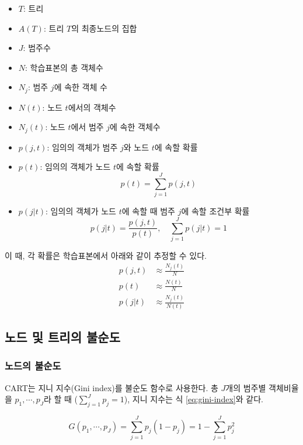 \documentclass[
]{book}
\providecommand{\tightlist}{%
  \setlength{\itemsep}{0pt}\setlength{\parskip}{0pt}}
\begin{document}
\begin{itemize}
\tightlist
\item
  \(T\): 트리
\item
  \(A(T)\): 트리 \(T\)의 최종노드의 집합
\item
  \(J\): 범주수
\item
  \(N\): 학습표본의 총 객체수
\item
  \(N_j\): 범주 \(j\)에 속한 객체 수
\item
  \(N(t)\): 노드 \(t\)에서의 객체수
\item
  \(N_j(t)\): 노드 \(t\)에서 범주 \(j\)에 속한 객체수
\item
  \(p(j,t)\): 임의의 객체가 범주 \(j\)와 노드 \(t\)에 속할 확률
\item
  \(p(t)\): 임의의 객체가 노드 \(t\)에 속할 확률
  \[p(t) = \sum_{j=1}^{J} p(j,t)\]
\item
  \(p(j|t)\): 임의의 객체가 노드 \(t\)에 속할 때 범주 \(j\)에 속할 조건부 확률
  \[p(j|t) = \frac{p(j,t)}{p(t)}, \quad \sum_{j=1}^{J} p(j|t) = 1\]
\end{itemize}

이 때, 각 확률은 학습표본에서 아래와 같이 추정할 수 있다.
\begin{align}
p(j,t) &\approx \frac{N_j(t)}{N}\\
p(t) &\approx \frac{N(t)}{N}\\
p(j|t) &\approx \frac{N_j(t)}{N(t)}
\end{align}

\hypertarget{cart-impurity}{%
\subsection{노드 및 트리의 불순도}\label{cart-impurity}}

\hypertarget{uxb178uxb4dcuxc758-uxbd88uxc21cuxb3c4}{%
\subsubsection{노드의 불순도}\label{uxb178uxb4dcuxc758-uxbd88uxc21cuxb3c4}}

CART는 지니 지수(Gini index)를 불순도 함수로 사용한다. 총 \(J\)개의 범주별 객체비율을 \(p_1, \cdots , p_J\)라 할 때 (\(\sum_{j=1}^{J} p_j = 1\)), 지니 지수는 식 \eqref{eq:gini-index}와 같다.

\begin{equation}
G(p_1, \cdots, p_J) = \sum_{j=1}^{J} p_j(1-p_j) = 1 - \sum_{j=1}^{J}p_j^2 \label{eq:gini-index}
\end{equation}
\end{document}

